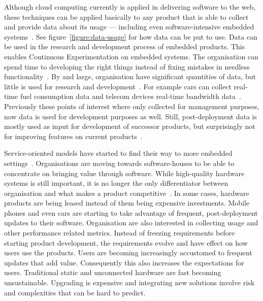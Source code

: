 \documentclass[english]{tktltiki2}
\begin{document}
Although cloud computing currently is applied in delivering software to the web, these techniques can be applied basically to any product that is able to collect and provide data about its usage — including even software-intensive embedded systems~\cite{BE12, Bos12}. See figure~\ref{figure:data-usage} for how data can be put to use. Data can be used in the research and development process of embedded products. This enables Continuous Experimentation on embedded systems. The organisation can spend time to developing the right things instead of fixing mistakes in needless functionality~\cite{HAB12}. By and large, organisation have significant quantities of data, but little is used for research and development~\cite{HB14}. For example cars can collect real-time fuel consumption data and telecom devices real-time bandwidth data~\cite{Bos12}. Previously these points of interest where only collected for management purposes, now data is used for development purposes as well. Still, post-deployment data is mostly used as input for development of successor products, but surprisingly not for improving features on current products~\cite{HB14}.

Service-oriented models have started to find their way to more embedded settings~\cite{BE12, Bos12}. Organisations are moving towards software-houses to be able to concentrate on bringing value through software. While high-quality hardware systems is still important, it is no longer the only differentiator between organisation and what makes a product competitive~\cite{EHS14}. In some cases, hardware products are being leased instead of them being expensive investments. Mobile phones and even cars are starting to take advantage of frequent, post-deployment updates to their software. Organisation are also interested in collecting usage and other performance related metrics. Instead of freezing requirements before starting product development, the requirements evolve and have effect on how users use the products. Users are becoming increasingly accustomed to frequent updates that add value. Consequently this also increases the expectations for users. Traditional static and unconnected hardware are fast becoming unsustainable. Upgrading is expensive and integrating new solutions involve risk and complexities that can be hard to predict.
\end{document}
